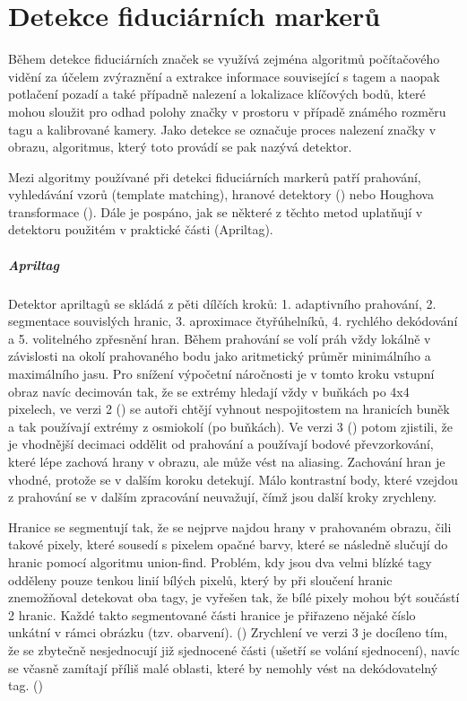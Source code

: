 \chapter{Detekce fiduciárních markerů} \label{chap:detection}
  Během detekce fiduciárních značek se využívá zejména algoritmů počítačového vidění za účelem zvýraznění a extrakce informace související s tagem a naopak potlačení pozadí a také případně nalezení a lokalizace klíčových bodů, které mohou sloužit pro odhad polohy značky v prostoru v případě známého rozměru tagu a kalibrované kamery. Jako detekce se označuje proces nalezení značky v obrazu, algoritmus, který toto provádí se pak nazývá detektor.

  Mezi algoritmy používané při detekci fiduciárních markerů patří prahování, vyhledávání vzorů (template matching), hranové detektory (\cite{apriltag2}) nebo Houghova transformace (\cite{Shabalina2019}). Dále je pospáno, jak se některé z těchto metod uplatňují v detektoru použitém v praktické části (Apriltag).

  \paragraph{Apriltag} Detektor apriltagů se skládá z pěti dílčích kroků: 1. adaptivního prahování, 2. segmentace souvislých hranic, 3. aproximace čtyřúhelníků, 4. rychlého dekódování a 5. volitelného zpřesnění hran. Během prahování se volí práh vždy lokálně v závislosti na okolí prahovaného bodu jako aritmetický průměr minimálního a maximálního jasu. Pro snížení výpočetní náročnosti je v tomto kroku vstupní obraz navíc decimován tak, že se extrémy hledají vždy v buňkách po 4x4 pixelech, ve verzi 2 (\cite{apriltag2}) se autoři chtějí vyhnout nespojitostem na hranicích buněk a tak používají extrémy z osmiokolí (po buňkách). Ve verzi 3 (\cite{apriltag3}) potom zjistili, že je vhodnější decimaci oddělit od prahování a používají bodové převzorkování, které lépe zachová hrany v obrazu, ale může vést na aliasing. Zachování hran je vhodné, protože se v dalším koroku detekují. Málo kontrastní body, které vzejdou z prahování se v dalším zpracování neuvažují, čímž jsou další kroky zrychleny.

  Hranice se segmentují tak, že se nejprve najdou hrany v prahovaném obrazu, čili takové pixely, které sousedí s pixelem opačné barvy, které se následně slučují do hranic pomocí algoritmu union-find. Problém, kdy jsou dva velmi blízké tagy odděleny pouze tenkou linií bílých pixelů, který by při sloučení hranic znemožňoval detekovat oba tagy, je vyřešen tak, že bílé pixely mohou být součástí 2 hranic. Každé takto segmentované části hranice je přiřazeno nějaké číslo unkátní v rámci obrázku (tzv. obarvení). (\cite{apriltag2}) Zrychlení ve verzi 3 je docíleno tím, že se zbytečně nesjednocují již sjednocené části (ušetří se volání sjednocení), navíc se včasně zamítají příliš malé oblasti, které by nemohly vést na dekódovatelný tag. (\cite{apriltag3})

